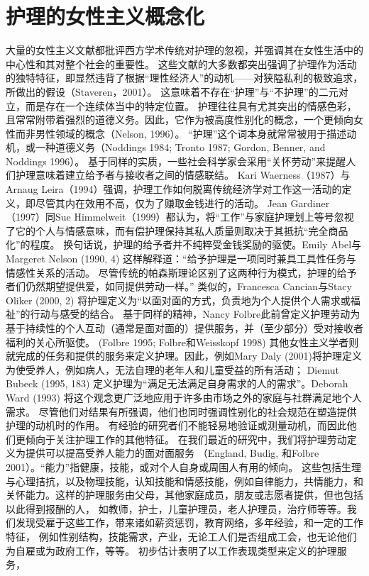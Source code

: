 \documentclass[UTF8]{ctexart}
\begin{document}
\section{护理的女性主义概念化}
大量的女性主义文献都批评西方学术传统对护理的忽视，并强调其在女性生活中的中心性和其对整个社会的重要性。
这些文献的大多数都突出强调了护理作为活动的独特特征，即显然违背了根据“理性经济人”的动机——对狭隘私利的极致追求，所做出的假设（Staveren，2001）。
这意味着不存在“护理”与“不护理”的二元对立，而是存在一个连续体当中的特定位置。
护理往往具有尤其突出的情感色彩，且常常附带着强烈的道德义务。因此，它作为被高度性别化的概念，一个更倾向女性而非男性领域的概念（Nelson, 1996）。
“护理”这个词本身就常常被用于描述动机，或一种道德义务（Noddings 1984; Tronto 1987; Gordon, Benner, and Noddings 1996）。
基于同样的实质，一些社会科学家会采用“关怀劳动”来提醒人们护理意味着建立给予者与接收者之间的情感联结。
Kari Waerness（1987）与Arnaug Leira（1994）强调，护理工作如何脱离传统经济学对工作这一活动的定义，即尽管其内在效用不高，仅为了赚取金钱进行的活动。
Jean Gardiner（1997）同Sue Himmelweit（1999）都认为，将“工作”与家庭护理划上等号忽视了它的个人与情感意味，而有偿护理保持其私人质量则取决于其抵抗“完全商品化”的程度。
换句话说，护理的给予者并不纯粹受金钱奖励的驱使。Emily Abel与Margeret Nelson (1990, 4) 这样解释道：“给予护理是一项同时兼具工具性任务与情感性关系的活动。
尽管传统的帕森斯理论区别了这两种行为模式，护理的给予者们仍然期望提供爱，如同提供劳动一样。”
类似的，Francesca Cancian与Stacy Oliker (2000, 2) 将护理定义为“以面对面的方式，负责地为个人提供个人需求或福祉”的行动与感受的结合。
基于同样的精神，Nancy Folbre此前曾定义护理劳动为基于持续性的个人互动（通常是面对面的）提供服务，并（至少部分）受对接收者福利的关心所驱使。
(Folbre 1995; Folbre和Weisskopf 1998)
其他女性主义学者则就完成的任务和提供的服务来定义护理。因此，例如Mary Daly (2001)将护理定义为使受养人，例如病人，无法自理的老年人和儿童受益的所有活动；
Diemut Bubeck (1995, 183) 定义护理为“满足无法满足自身需求的人的需求”。Deborah Ward (1993) 将这个观念更广泛地应用于许多由市场之外的家庭与社群满足地个人需求。
尽管他们对结果有所强调，他们也同时强调性别化的社会规范在塑造提供护理的动机时的作用。
有经验的研究者们不能轻易地验证或测量动机，而因此他们更倾向于关注护理工作的其他特征。
在我们最近的研究中，我们将护理劳动定义为提供可以提高受养人能力的面对面服务 （England, Budig, 和Folbre 2001）。“能力”指健康，技能，或对个人自身或周围人有用的倾向。
这些包括生理与心理拮抗，以及物理技能，认知技能和情感技能，例如自律能力，共情能力，和关怀能力。这样的护理服务由父母，其他家庭成员，朋友或志愿者提供，但也包括以此得到报酬的人，
如教师，护士，儿童护理员，老人护理员，治疗师等等。我们发现受雇于这些工作，带来诸如薪资惩罚，教育网络，多年经验，和一定的工作特征，
例如性别结构，技能需求，产业，无论工人们是否组成工会，也无论他们为自雇或为政府工作，等等。
初步估计表明了以工作表现类型来定义的护理服务，
\end{document}
